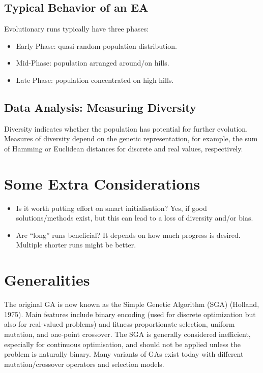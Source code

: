 \subsection*{Typical Behavior of an EA}
Evolutionary runs typically have three phases:
\begin{itemize}
    \item Early Phase: quasi-random population distribution.
    \item Mid-Phase: population arranged around/on hills.
     \item Late Phase: population concentrated on high hills.
\end{itemize}

\subsection*{Data Analysis: Measuring Diversity}
Diversity indicates whether the population has potential for further evolution.  Measures of diversity depend on the genetic representation, for example, the sum of Hamming or Euclidean distances for discrete and real values, respectively.

\section{Some Extra Considerations}
\begin{itemize}
    \item Is it worth putting effort on smart initialisation? Yes, if good solutions/methods exist, but this can lead to a loss of diversity and/or bias.
    \item Are “long” runs beneficial? It depends on how much progress is desired. Multiple shorter runs might be better.
\end{itemize}

\section{Generalities}
The original GA is now known as the Simple Genetic Algorithm (SGA) (Holland, 1975). Main features include binary encoding (used for discrete optimization but also for real-valued problems) and fitness-proportionate selection, uniform mutation, and one-point crossover. The SGA is generally considered inefficient, especially for continuous optimisation, and should not be applied unless the problem is naturally binary. Many variants of GAs exist today with different mutation/crossover operators and selection models.


